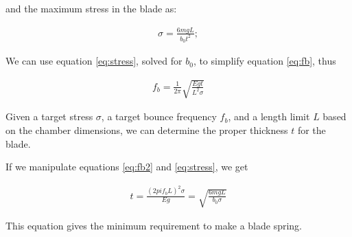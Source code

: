 and the maximum stress in the blade as:

\begin{eqnarray}
\sigma = \frac{6 m g L}{ b_0 t^2};
\label{eq:stress}
\end{eqnarray}

We can use equation \ref{eq:stress}, solved for $b_0$, to simplify equation \ref{eq:fb}, thus

\begin{eqnarray}
f_b = \frac{1}{2\pi}\sqrt{\frac{E g t}{L^2 \sigma}}
\label{eq:fb2}
\end{eqnarray}

Given a target stress $\sigma$, a target bounce frequency $f_b$, and a length limit $L$ based on the chamber dimensions, we can determine the proper thickness $t$ for the blade.

If we manipulate equations \ref{eq:fb2} and \ref{eq:stress}, we get

\begin{eqnarray}
t = \frac{(2 pi f_b L)^2 \sigma}{E g} = \sqrt{\frac{6 m g L}{ b_0 \sigma}}
\label{eq:thickness}
\end{eqnarray}

This equation gives the minimum requirement to make a blade spring.

% 
% 



